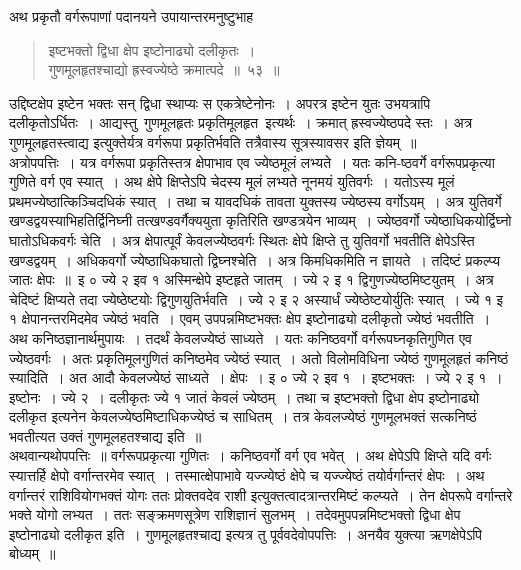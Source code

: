 \documentclass[11pt, openany]{book}
\begin{document}
\vspace{-3mm}
 अथ प्रकृतौ वर्गरूपाणां पदानयने उपायान्तरमनुष्टुभाह\textendash
 
 \label{53}
\begin{quote}
    \bs
      इष्टभक्तो द्विधा क्षेप इष्टोनाढ्यो दलीकृतः~। \\
 गुणमूलहृतश्चाद्यो ह्रस्वज्येष्ठे क्रमात्पदे~॥~५३~॥~
\end{quote}

 उद्दिष्टक्षेप इष्टेन भक्तः सन् द्विधा स्थाप्यः स एकत्रेष्टेनोनः~। 
अपरत्र इष्टेन युतः उभयत्रापि दलीकृतोऽर्धितः~। आद्यस्तु \,गुणमूलहृतः \;प्रकृतिमूलहृत \,इत्यर्थः~। क्रमात् ह्रस्वज्येष्ठपदे स्तः~। अत्र गुणमूलहृतस्त्वाद्य 
इत्युक्तेर्यत्र वर्गरूपा प्रकृतिर्भवति तत्रैवास्य सूत्रस्यावसर इति ज्ञेयम्~॥\\

\vspace{-3mm}
 अत्रोपपत्तिः~। यत्र वर्गरूपा प्रकृतिस्तत्र क्षेपाभाव एव ज्येष्ठमूलं 
लभ्यते~। यतः कनि-ष्ठवर्गे वर्गरूपप्रकृत्या गुणिते वर्ग एव स्यात्~। अथ क्षेपे 
क्षिप्तेऽपि चेदस्य मूलं लभ्यते नूनमयं युतिवर्गः~। यतोऽस्य मूलं 
प्रथमज्येष्ठात्किञ्चिदधिकं स्यात्~। तथा च यावदधिकं तावता युक्तस्य ज्येष्ठस्य 
वर्गोऽयम्~। अत्र युतिवर्गे खण्डद्वयस्याभिहतिर्द्विनिघ्नी तत्खण्डवर्गैक्ययुता कृतिरिति 
खण्डत्रयेन भाव्यम्~। ज्येष्ठवर्गो ज्येष्ठाधिकयोर्द्विघ्नो घातोऽधिकवर्गः चेति~। 
अत्र क्षेपात्पूर्वं केवलज्येष्ठवर्गः स्थितः क्षेपे क्षिप्ते तु युतिवर्गो भवतीति 
क्षेपेऽस्ति खण्डद्वयम्~। अधिकवर्गो ज्येष्ठाधिकघातो द्विघ्नश्चेति~। अत्र
किमधिकमिति न ज्ञायते~। तदिष्टं प्रकल्प्य जातः क्षेपः~॥~इ ० ज्ये २ 
इव १ अस्मिन्क्षेपे इष्टहृते जातम्~। ज्ये २ इ १ द्विगुणज्येष्ठमिष्टयुतम्~। 
अत्र चेदिष्टं क्षिप्यते तदा ज्येष्ठेष्टयोः द्विगुणयुतिर्भवति~। ज्ये २ इ २ 
अस्यार्धं ज्येष्ठेष्टयोर्युतिः स्यात्~। ज्ये १ इ १ क्षेपानन्तरमिदमेव ज्येष्ठं 
भवति~। एवम् उपपन्नमिष्टभक्तः क्षेप इष्टोनाढ्यो दलीकृतो ज्येष्ठं भवतीति~। अथ 
कनिष्ठज्ञानार्थमुपायः~। तदर्थं केवलज्येष्ठं साध्यते~। यतः कनिष्ठवर्गो 
वर्गरूपघ्नकृतिगुणित एव ज्येष्ठवर्गः~। अतः प्रकृतिमूलगुणितं कनिष्ठमेव 
\newpage
\noindent ज्येष्ठं स्यात्~। अतो विलोमविधिना ज्येष्ठं गुणमूलहृतं कनिष्ठं स्यादिति~। अत आदौ केवलज्येष्ठं साध्यते~। क्षेपः~। इ ० ज्ये २ इव १~। इष्टभक्तः~। ज्ये २ इ १~। इष्टोनः~। ज्ये २~। दलीकृतः ज्ये १ जातं केवलं ज्येष्ठम्~। तथा च इष्टभक्तो द्विधा क्षेप इष्टोनाढ्यो दलीकृत इत्यनेन केवलज्येष्ठमिष्टाधिकज्येष्ठं च साधितम्~। तत्र केवलज्येष्ठं गुणमूलभक्तं
सत्कनिष्ठं भवतीत्यत उक्तं गुणमूलहतश्चाद्य इति~॥\\

\vspace{-3mm}
 अथवान्यथोपपत्तिः~॥ वर्गरूपप्रकृत्या गुणितः~। कनिष्ठवर्गो वर्ग एव 
भवेत्~। अथ क्षेपेऽपि क्षिप्ते यदि वर्गः स्यात्तर्हि क्षेपो वर्गान्तरमेव स्यात्~। 
तस्मात्क्षेपाभावे यज्ज्येष्ठं क्षेपे च यज्ज्येष्ठं तयोर्वर्गान्तरं क्षेपः~। अथ वर्गान्तरं 
राशिवियोगभक्तं योगः ततः प्रोक्तवदेव राशी इत्युक्तत्वादत्रान्तरमिष्टं कल्प्यते~। 
तेन क्षेपरूपे वर्गान्तरे भक्ते योगो लभ्यत~। ततः सङ्क्रमणसूत्रेण राशिज्ञानं 
सुलभम्~। तदेवमुपपन्नमिष्टभक्तो द्विधा क्षेप इष्टोनाढ्यो दलीकृत इति~। 
गुणमूलहृतश्चाद्य इत्यत्र तु पूर्ववदेवोपपत्तिः~। अनयैव युक्त्या ऋणक्षेपेऽपि बोध्यम्~॥\\
\end{document}
